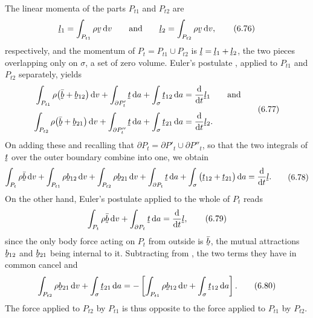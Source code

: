 The linear momenta of the parts $P_{t1}$ and $P_{t2}$ are
\begin{equation}
   \vek{l}_{1}=\int_{P_{t1}}\rho\bv\,\dl v
   \qquad\text{and}\qquad
   \vek{l}_{2}=\int_{P_{t2}}\rho\bv\,\dl v ,
   \tag{6.76}\label{eq:6.76}
\end{equation}
respectively, and the momentum of $P_{t}=P_{t1}\cup P_{t2}$ is
$\vek{l}=\vek{l}_{1}+\vek{l}_{2}$, the two pieces overlapping only on
$\sigma$, a set of zero volume. Euler's postulate , applied
to $P_{t1}$ and $P_{t2}$ separately, yields
\begin{equation}
\begin{aligned}
   \int_{P_{t1}}\rho\big(\bar{\bb}+\bb_{12}\big)\,\dl v
   +\int_{\partial P'_{t}}\bt\,\dl a+\int_{\sigma}\bt_{12}\,\dl a
   &=\frac{\dl}{\dl t}\vek{l}_{1}
   \qquad\text{and}\\[1mm]
   \int_{P_{t2}}\rho\big(\bar{\bb}+\bb_{21}\big)\,\dl v
   +\int_{\partial P''_{t}}\bt\,\dl a+\int_{\sigma}\bt_{21}\,\dl a
   &=\frac{\dl}{\dl t}\vek{l}_{2}.
\end{aligned}
   \tag{6.77}\label{eq:6.77}
\end{equation}
On adding these and recalling that
$\partial P_{t}=\partial P'_{t}\cup\partial P''_{t}$, so that the two
integrals of $\bt$ over the outer boundary combine into one, we obtain
\begin{equation}
\begin{aligned}
   \int_{P_{t}}\rho\bar{\bb}\,\dl v
   +\int_{P_{t1}}\rho\bb_{12}\,\dl v
   +\int_{P_{t2}}\rho\bb_{21}\,\dl v
   +\int_{\partial P_{t}}\bt\,\dl a
   +\int_{\sigma}\big(\bt_{12}+\bt_{21}\big)\,\dl a
   =\frac{\dl}{\dl t}\vek{l} .
\end{aligned}
   \tag{6.78}\label{eq:6.78}
\end{equation}
On the other hand, Euler's postulate applied to the whole of $P_{t}$
reads
\begin{equation}
   \int_{P_{t}}\rho\bar{\bb}\,\dl v+\int_{\partial P_{t}}\bt\,\dl a
   =\frac{\dl}{\dl t}\vek{l} ,
   \tag{6.79}\label{eq:6.79}
\end{equation}
since the only body force acting on $P_{t}$ from outside is
$\bar{\bb}$, the mutual attractions $\bb_{12}$ and $\bb_{21}$ being
internal to it. Subtracting  from , the two terms
they have in common cancel and
\begin{equation}
   \int_{P_{t2}}\rho\bb_{21}\,\dl v+\int_{\sigma}\bt_{21}\,\dl a
   =-\left[\int_{P_{t1}}\rho\bb_{12}\,\dl v
   +\int_{\sigma}\bt_{12}\,\dl a\right].
   \tag{6.80}\label{eq:6.80}
\end{equation}
The force applied to $P_{t2}$ by $P_{t1}$ is thus opposite to the force
applied to $P_{t1}$ by $P_{t2}$.

